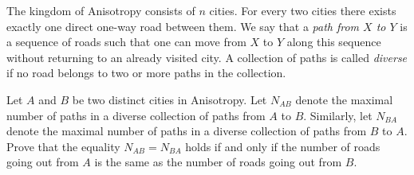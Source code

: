 The kingdom of Anisotropy consists of $n$ cities. For every two cities there exists exactly one direct one-way road between them. We say that a \emph{path from $X$ to $Y$} is a sequence of roads such that one can move from $X$ to $Y$ along this sequence without returning to an already visited city. A collection of paths is called \emph{diverse} if no road belongs to two or more paths in the collection.

Let $A$ and $B$ be two distinct cities in Anisotropy. Let $N_{AB}$ denote the maximal number of paths in a diverse collection of paths from $A$ to $B$. Similarly, let $N_{BA}$ denote the maximal number of paths in a diverse collection of paths from $B$ to $A$. Prove that the equality $N_{AB} = N_{BA}$ holds if and only if the number of roads going out from $A$ is the same as the number of roads going out from $B$.
